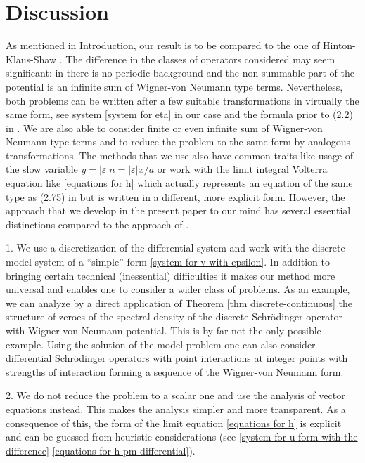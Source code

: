 \documentclass[a4paper,oneside,12pt]{amsart}
\begin{document}
\section{Discussion}\label{section discussion}

As mentioned in Introduction, our result is to be compared to the
one of Hinton-Klaus-Shaw \cite{Hinton-Klaus-Shaw-1991}. The
difference in the classes of operators considered may seem
significant: in \cite{Hinton-Klaus-Shaw-1991} there is no periodic
background and the non-summable part of the potential is an
infinite sum of Wigner-von Neumann type terms. Nevertheless, both
problems can be written after a few suitable transformations in
virtually the same form, see system \eqref{system for eta} in our
case and the formula prior to (2.2) in
\cite{Hinton-Klaus-Shaw-1991}. We are also able to consider finite
or even infinite sum of Wigner-von Neumann type terms and to
reduce the problem to the same form by analogous transformations.
The methods that we use also have common traits like usage of the
slow variable $y=|\varepsilon|n=|\varepsilon|x/a$ or work with the
limit integral Volterra equation like \eqref{equations for h}
which actually represents an equation of the same type as (2.75)
in \cite{Hinton-Klaus-Shaw-1991} but is written in a different, more
explicit form. However, the approach that we develop in the
present paper to our mind has several essential distinctions compared to the
approach of \cite{Hinton-Klaus-Shaw-1991}.

1. We use a discretization of the differential system and  work
with the discrete model system of a ``simple'' form \eqref{system
for v with epsilon}. In addition to bringing certain technical
(inessential) difficulties it makes our method more universal and enables one to
consider a wider class of problems. As an example, we can analyze by
a direct application of Theorem \ref{thm discrete-continuous} the
structure of zeroes of the spectral density of the discrete
Schr\"odinger operator with Wigner-von Neumann potential. This is
by far not the only possible example. Using the solution of the
model problem one can also consider differential Schr\"odinger
operators with point interactions at integer points with strengths
of interaction forming a sequence of the Wigner-von Neumann form.

2. We do not reduce the problem to a scalar one  and use the
analysis of vector equations instead. This makes the analysis
simpler and more transparent. As a consequence of this, the form
of the limit equation \eqref{equations for h} is explicit and can
be guessed from heuristic considerations (see \eqref{system for u
form with the difference}-\eqref{equations for h-pm
differential}).
\end{document}
